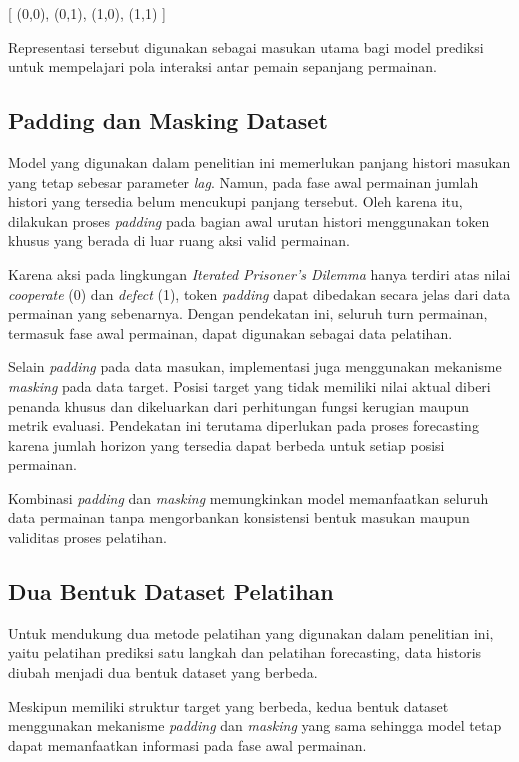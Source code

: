 [
(0,0), (0,1), (1,0), (1,1)
]

Representasi tersebut digunakan sebagai masukan utama bagi model prediksi untuk mempelajari pola interaksi antar pemain sepanjang permainan.

\subsection{Padding dan Masking Dataset}

Model yang digunakan dalam penelitian ini memerlukan panjang histori masukan yang tetap sebesar parameter \textit{lag}. Namun, pada fase awal permainan jumlah histori yang tersedia belum mencukupi panjang tersebut. Oleh karena itu, dilakukan proses \textit{padding} pada bagian awal urutan histori menggunakan token khusus yang berada di luar ruang aksi valid permainan.

Karena aksi pada lingkungan \textit{Iterated Prisoner's Dilemma} hanya terdiri atas nilai \textit{cooperate} (0) dan \textit{defect} (1), token \textit{padding} dapat dibedakan secara jelas dari data permainan yang sebenarnya. Dengan pendekatan ini, seluruh turn permainan, termasuk fase awal permainan, dapat digunakan sebagai data pelatihan.

Selain \textit{padding} pada data masukan, implementasi juga menggunakan mekanisme \textit{masking} pada data target. Posisi target yang tidak memiliki nilai aktual diberi penanda khusus dan dikeluarkan dari perhitungan fungsi kerugian maupun metrik evaluasi. Pendekatan ini terutama diperlukan pada proses forecasting karena jumlah horizon yang tersedia dapat berbeda untuk setiap posisi permainan.

Kombinasi \textit{padding} dan \textit{masking} memungkinkan model memanfaatkan seluruh data permainan tanpa mengorbankan konsistensi bentuk masukan maupun validitas proses pelatihan.

\subsection{Dua Bentuk Dataset Pelatihan}

Untuk mendukung dua metode pelatihan yang digunakan dalam penelitian ini, yaitu pelatihan prediksi satu langkah dan pelatihan forecasting, data historis diubah menjadi dua bentuk dataset yang berbeda.

Meskipun memiliki struktur target yang berbeda, kedua bentuk dataset menggunakan mekanisme \textit{padding} dan \textit{masking} yang sama sehingga model tetap dapat memanfaatkan informasi pada fase awal permainan.

